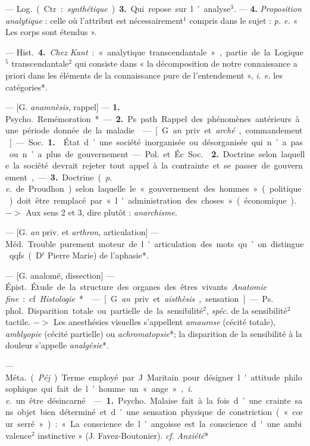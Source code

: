 \begin{itemize}[leftmargin=1cm, label=, itemsep=1pt]
{— \si{Log.} (Ctr. : {\it synthétique}). {\bf 3.} Qui
repose sur l’analyse$^3$. — {\bf 4.} {\it Proposition analytique} : celle où l’attribut
est nécessairement$^1$ compris dans le
sujet : {\it p. e.} « Les corps sont étendus ».

— \si{Hist.} {\bf 4.} {\it Chez Kant} : « analytique transcendantale », partie de
la Logique$^5$ transcendantale$^2$ qui
consiste dans « la décomposition de
notre connaissance a priori dans les
éléments de la connaissance pure de
l’entendement », {\it i. e.} les catégories*.

 — [G. {\it anamnèsis}, rappel] —
{\bf 1.} \si{Psycho.} Remémoration*. — {\bf 2.} Ps.
path. Rappel des phénomènes antérieurs à une période donnée de la
maladie.

 — [G. {\it an} priv. et {\it arché}, commandement] — \si{Soc.} {\bf 1.}  État
d’une société inorganisée ou désorganisée qui n’a pas ou n’a plus de
gouvernement.

— \si{Pol.} et Éc. \si{Soc.}  {\bf 2.} Doctrine
selon laquelle la société devrait
rejeter tout appel à la contrainte et
se passer de gouvernement, — {\bf 3.}
Doctrine ({\it p. e.} de Proudhon) selon
laquelle le « gouvernement des
hommes » (politique) doit être remplacé par « l'administration des
choses » (économique). $->$ Aux
sens 2 et 3, dire plutôt : {\it anarchisme}.

 — [G. {\it an} priv. et {\it arthron},
articulation] — \si{Méd.} Trouble purement moteur de l'articulation des
mots qu’on distingue qqfs (D$^\text{r}$ Pierre
Marie) de l’aphasie*.

 — [G. analomë, dissection]
— \si{Épist.} Étude de la structure des
organes des êtres vivants. {\it Anatomie
fine} : cf.  {\it Histologie}*.

 — [G. {\it an} priv. et {\it aisthèsis},
sensation] — \si{Ps. phol.} Disparition
totale ou partielle de la sensibilité$^2$,
{\it spéc}. de la sensibilité$^2$ tactile. $->$
Les anesthésies visuelles s’appellent
{\it amaurose} (cécité totale), {\it amblyopie}
(cécité partielle) ou {\it achromatopsie}*;
la disparition de la sensibilité à la
douleur s’appelle {\it analgésie}*.

 — \si{Méta.} ({\it Péj}.) Terme
employé par J. Maritain pour désigner l'attitude philosophique qui
fait de l’homme un « ange », {\it i. e.} un
être désincarné.

 — {\bf 1.} \si{Psycho.} Malaise fait à
la fois d’une crainte sans objet bien
déterminé et d’une sensation physique de constriction (« cœur serré ») :
« La conscience de l’angoisse est la
conscience d'une ambivalence$^2$ instinctive » (J. Favez-Boutonier). {\it cf.} 
{\it Anxiété}*

}
\end{itemize}
